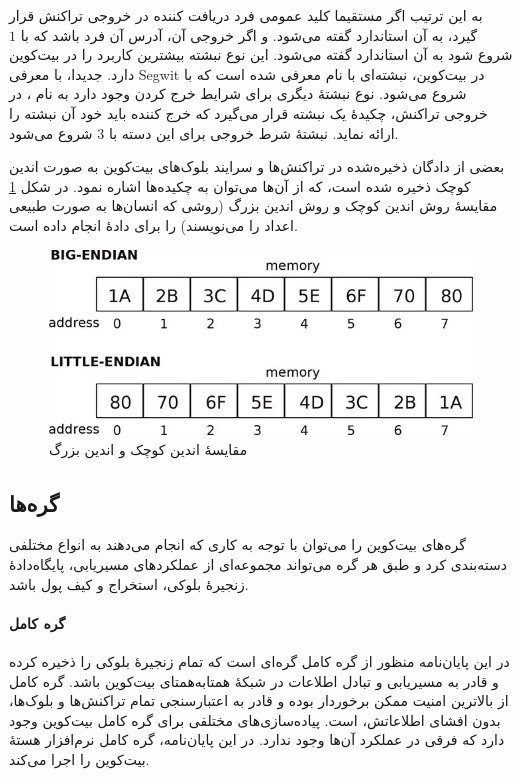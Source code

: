 به این ترتیب اگر مستقیما کلید عمومی فرد دریافت کننده در خروجی تراکنش قرار گیرد، به آن استاندارد
 گفته می‌شود. و اگر خروجی آن، آدرس آن فرد باشد که با $1$ شروع شود به آن استاندارد 
گفته می‌شود. این نوع نبشته بیشترین کاربرد را در بیت‌کوین دارد. جدیدا، با معرفی 
\gls{Segwit}
در بیت‌کوین، نبشته‌ای با نام 
معرفی شده است که با  شروع می‌شود. نوع نبشته‌ٔ دیگری برای شرایط خرج کردن وجود دارد به نام 
، در خروجی تراکنش، چکیدهٔ یک نبشته قرار می‌گیرد که خرج کننده باید خود آن نبشته‌ را ارائه نماید. نبشتهٔ شرط خروجی برای این دسته با $3$ شروع می‌شود.

بعضی از دادگان ذخیره‌شده در تراکنش‌ها و سرایند بلوک‌های بیت‌کوین به صورت 
اندین کوچک
ذخیره شده است، که از آن‌ها می‌توان به چکیده‌ها اشاره نمود. در شکل \ref{fig:endian} مقایسهٔ روش اندین کوچک و روش اندین بزرگ  (روشی که انسان‌ها به صورت طبیعی اعداد را می‌نویسند) را برای دادهٔ  انجام داده است.

\begin{figure}[h]
	\centering
	\includegraphics[width=0.7\linewidth]{image/endian}
	\caption{مقایسهٔ اندین کوچک و اندین بزرگ\cite{Grochowski2020}}
	\label{fig:endian}
\end{figure}


\subsection{گره‌ها‌}
گره‌‌های بیت‌کوین را می‌توان با توجه به کاری که انجام می‌دهند به انواع مختلفی دسته‌بندی کرد و طبق \cite{Antonopoulos2016} هر گره می‌تواند مجموعه‌ای از عملکرد‌های مسیریابی، پایگاه‌دادهٔ زنجیره‌ٔ بلوکی، استخراج و کیف پول باشد.
\paragraph{گره کامل}
در این پایان‌نامه منظور از گره کامل گره‌ای است که تمام زنجیرهٔ بلوکی را ذخیره کرده و قادر به مسیریابی و تبادل اطلاعات در شبکهٔ همتا‌به‌همتای بیت‌کوین باشد. گره کامل از بالاترین امنیت ممکن برخوردار بوده و قادر به اعتبارسنجی تمام تراکنش‌ها و بلوک‌ها، بدون افشای اطلاعاتش، است. پیاده‌سازی‌های مختلفی برای گره کامل بیت‌کوین وجود دارد که فرقی در عملکرد آن‌ها وجود ندارد. در این پایان‌نامه، گره کامل نرم‌افزار هستهٔ بیت‌کوین\cite{Bitcoincore.org} را اجرا می‌کند.


